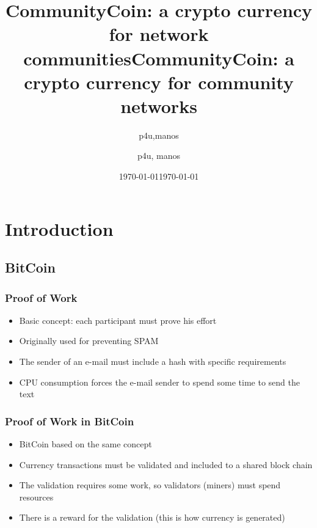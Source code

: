 \documentclass[usepdftitle=false,13pt]{beamer}
\title[CommunityCoin: a crypto currency for network communities]{CommunityCoin: a crypto currency for network communities}
\author[{p4u,manos}]{p4u,manos}
\institute[{guifi.net,upc}]{guifi.net,upc}
\date[\today]{\today}
\begin{document}
\title[CommunityCoin\hspace{20em}\insertframenumber/\inserttotalframenumber]{CommunityCoin: a crypto currency for community networks}  
\author[p4u,manos]{ p4u, manos\\
 }

\date{\today} 

\frame{\titlepage}




\section{Introduction}
\subsection{BitCoin}



\begin{frame}\frametitle{Proof of Work}
	\begin{itemize}
		\item Basic concept: each participant must prove his effort
		
		\item Originally used for preventing SPAM 
		
		\item  The sender of an e-mail must include a hash with specific requirements
	
		\item CPU consumption forces the e-mail sender to spend some time to send the text
	\end{itemize}
\end{frame}

\begin{frame}\frametitle{Proof of Work in BitCoin}
	\begin{itemize}
		\item BitCoin based on the same concept
		\item Currency transactions must be validated and included to a shared block chain
		\item The validation requires some work, so validators (miners) must spend resources
		\item There is a reward for the validation (this is how currency is generated)
	\end{itemize}
\end{frame}
\end{document}
